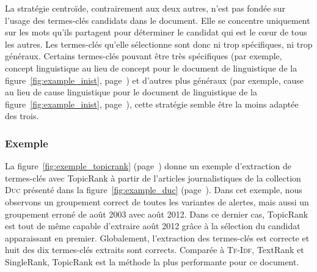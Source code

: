         La stratégie centroïde, contrairement aux deux autres, n'est pas fondée
        sur l'usage des termes-clés candidats dans le document. Elle se
        concentre uniquement sur les mots qu'ils partagent pour déterminer le
        candidat qui est le c\oe{}ur de tous les autres. Les termes-clés qu'elle
        sélectionne sont donc ni trop spécifiques, ni trop généraux. Certains
        termes-clés pouvant être très spécifiques (par exemple, \og{}concept
        linguistique\fg{} au lieu de \og{}concept\fg{} pour le document de
        linguistique de la figure~\ref{fig:example_inist},
        page~\pageref{fig:example_inist}) et d'autres plus généraux (par
        exemple, \og{}cause\fg{} au lieu de \og{}cause linguistique\fg{} pour le
        document de linguistique de la figure~\ref{fig:example_inist},
        page~\pageref{fig:example_inist}), cette stratégie semble être la moins
        adaptée des trois.

      \subsubsection{Exemple}
      \label{subsubsec:main:domain_independent_keyphrase_extraction-unsupervised_automatic_keyphrase_extraction-topicrank-example}
        La figure~\ref{fig:exemple_topicrank}
        (page~\pageref{fig:exemple_topicrank}) donne un exemple d'extraction de
        termes-clés avec TopicRank à partir de l'articles journalistiques
        de la collection \textsc{Duc} présenté dans la figure~\ref{fig:example_duc}
        (page~\pageref{fig:example_duc}). Dans cet exemple,
        nous observons un groupement correct de toutes les variantes de
        \og{}aler\-tes\fg{}, mais aussi un groupement erroné de \og{}août 2003\fg{} avec
        \og{}août 2012\fg{}. Dans ce dernier cas, TopicRank est tout de même
        capable d'extraire \og{}août 2012\fg{} grâce à la sélection du candidat
        apparaissant en premier. Globalement, l'extraction des termes-clés est
        correcte et huit des dix termes-clés extraits sont corrects. Comparée à
        \textsc{Tf-Idf}, TextRank et SingleRank, TopicRank est la méthode la
        plus performante pour ce document.
        

